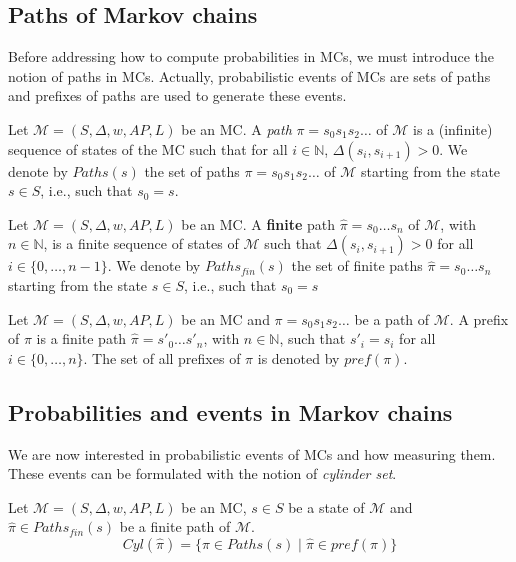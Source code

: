 \subsection{Paths of Markov chains}
Before addressing how to compute probabilities in MCs, we must introduce the notion of paths in MCs. Actually, probabilistic events of MCs are sets of paths and prefixes of paths are used to generate these events.
\begin{definition} Let $\mathcal{M} = (S, \Delta, w, AP, L)$ be an MC.
A \textit{path} $\pi = s_0 s_1 s_2 \dots$ of $\mathcal{M}$ is a (infinite) sequence of states of the MC such that for all $i \in \mathbb{N}$, $\Delta(s_i, s_{i+1})> 0$. We denote by $Paths(s)$ the set of paths $\pi = s_0s_1s_2\dots$ of $\mathcal{M}$ starting from the state $s \in S$, i.e., such that $s_0 = s$.
\end{definition}
\begin{definition}
Let $\mathcal{M} = (S, \Delta, w, AP, L)$ be an MC.
A \textbf{finite} path $\hat{\pi} = s_0 \dots s_n$ of $\mathcal{M}$, with $n \in \mathbb{N}$, is a finite sequence of states of $\mathcal{M}$ such that $\Delta(s_i, s_{i+1}) > 0$ for all $i \in \{0, \dots, n-1\}$.
We denote by $Paths_{fin}(s)$ the set of finite paths $\hat{\pi} = s_0 \dots s_n$ starting from the state $s \in S$, i.e., such that $s_0 = s$
\end{definition}
\begin{definition}
Let $\mathcal{M} = (S, \Delta, w, AP, L)$ be an MC and $\pi = s_0s_1s_2 \dots$ be a path of $\mathcal{M}$. A prefix of $\pi$ is a finite path $\hat{\pi} = s'_0 \dots s'_n$, with $n \in \mathbb{N}$, such that $s'_i = s_i$ for all $i \in \{0, \dots, n\}$.
The set of all prefixes of $\pi$ is denoted by $pref(\pi)$.
\end{definition}

\subsection{Probabilities and events in Markov chains}

We are now interested in probabilistic events of MCs and how measuring them. These events can be formulated with the notion of \textit{cylinder set}.

\begin{definition}
Let $\mathcal{M} = (S, \Delta, w, AP, L)$ be an MC, $s \in S$ be a state of $\mathcal{M}$ and $\hat{\pi} \in Paths_{fin}(s)$ be a finite path of $\mathcal{M}$.
\[Cyl(\hat{\pi})=\{\pi\in Paths(s)\;|\;\hat{\pi}\in pref(\pi) \} \]
\end{definition}


